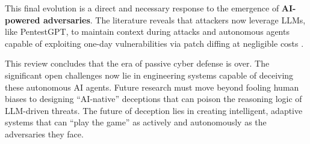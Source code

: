 This final evolution is a direct and necessary response to the emergence of
\textbf{AI-powered adversaries}. The literature reveals that attackers now leverage
LLMs, like PentestGPT, to maintain context during attacks \cite{deng2023pentestgpt}
and autonomous agents capable of exploiting one-day vulnerabilities via patch
diffing at negligible costs \cite{fang2024llm}.

This review concludes that the era of passive cyber defense is over. The significant
open challenges now lie in engineering systems capable of deceiving these autonomous
AI agents. Future research must move beyond fooling human biases to designing
``AI-native'' deceptions that can poison the reasoning logic of LLM-driven threats.
The future of deception lies in creating intelligent, adaptive systems that can
``play the game'' as actively and autonomously as the adversaries they face.
